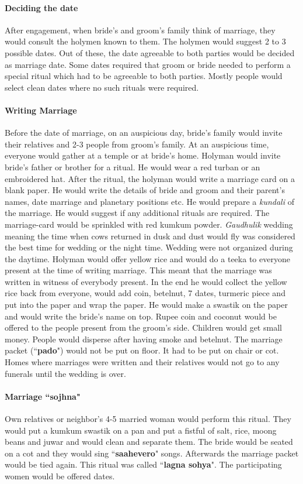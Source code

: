 \paragraph{Deciding the date} After engagement, when bride's and groom's family
think of marriage, they would consult the holymen known to them. The holymen
would suggest 2 to 3 possible dates. Out of these, the date agreeable to both
parties would be decided as marriage date. Some dates required that groom or
bride needed to perform a special ritual which had to be agreeable to both
parties. Mostly people would select clean dates where no such rituals were
required. 

\paragraph{Writing Marriage} Before the date of marriage, on an auspicious day,
bride's family would invite their relatives and 2-3 people from groom's family.
At an auspicious time, everyone would gather at a temple or at bride's home.
Holyman would invite bride's father or brother for a ritual. He would wear a
red turban or an embroidered hat. After the ritual, the holyman would write a
marriage card on a blank paper. He would write the details of bride and groom
and their parent's names, date marriage and planetary positions etc. He would
prepare a \textit{kundali} of the marriage. He would suggest if any additional
rituals are required. The marriage-card would be sprinkled with red kumkum
powder. \textit{Gaudhulik} wedding meaning the time when cows returned in dusk
and dust would fly was considered the best time for wedding or the night time.
Wedding were not organized during the daytime. Holyman would offer yellow rice
and would do a teeka to everyone present at the time of writing marriage. This
meant that the marriage was written in witness of everybody present. In the end
he would collect the yellow rice back from everyone, would add coin, betelnut,
7 dates, turmeric piece and put into the paper and wrap the paper. He would
make a swastik on the paper and would write the bride's name on top. Rupee coin
and coconut would be offered to the people present from the groom's side.
Children would get small money. People would disperse after having smoke and
betelnut. The marriage packet (``\textbf{pado}") would not be put on floor. It
had to be put on chair or cot. Homes where marriages were written and their
relatives would not go to any funerals until the wedding is over.

\paragraph{Marriage ``sojhna"} Own relatives or neighbor's 4-5 married woman
would perform this ritual. They would put a kumkum swastik on a pan and put a
fistful of salt, rice, moong beans and juwar and would clean and separate them.
The bride would be seated on a cot and they would sing ``\textbf{saahevero}"
songs. Afterwards the marriage packet would be tied again. This ritual was
called ``\textbf{lagna sohya}". The participating women would be offered dates.

